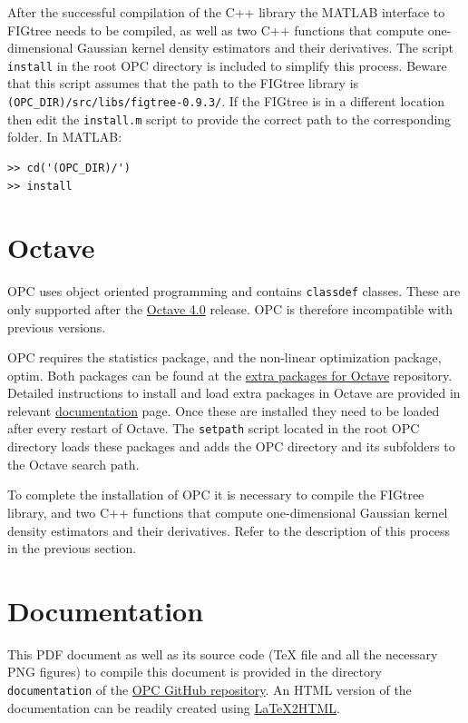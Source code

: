 \documentclass{book}
\begin{document}
After the successful compilation of the C++ library the MATLAB interface to
FIGtree needs to be compiled, as well as two C++ functions that compute
one-dimensional Gaussian kernel density estimators and their derivatives.
%
The script {\tt install} in the root OPC directory is included to simplify this process.
Beware that this script assumes that the path to the FIGtree library is
{\tt (OPC\_DIR)/src/libs/figtree-0.9.3/}. If the FIGtree is in a different location
then edit the {\tt install.m} script to provide the correct path to the corresponding folder.
%
In MATLAB:

\begin{verbatim}
>> cd('(OPC_DIR)/')
>> install
\end{verbatim}


\section{Octave}\label{sec:Octave}

OPC uses object oriented programming and contains {\tt classdef}
classes. These are only supported after the
%
\href{https://octave.org/doc/v4.2.2/classdef-Classes.html#classdef-Classes}
{Octave 4.0}
%
release. OPC is therefore incompatible with previous versions.


OPC requires the statistics package, and the non-linear optimization package,
optim. 
%
Both packages can be found at the
\href{https://octave.sourceforge.io/packages.php}{extra packages for 
Octave} repository.
%
Detailed instructions to install and load extra packages in Octave are
provided in relevant
\href{https://octave.org/doc/interpreter/Packages.html#Packages}{documentation}
page.
%
Once these are installed they need to be loaded after every restart
of Octave. The {\tt setpath} script located in the root OPC directory loads
these packages and adds the OPC directory and its subfolders
to the Octave search path.

To complete the installation of OPC it is necessary to compile the FIGtree
library, and two C++ functions that compute one-dimensional Gaussian kernel
density estimators and their derivatives. Refer to the description of this
process in the previous section.



\section{Documentation}


This PDF document as well as its
source code ({\TeX} file and all the necessary PNG figures) to compile this document is
provided in the directory {\tt documentation} of the
%
\href{https://github.com/nicospavlidis/opc}
{OPC GitHub repository}.
%
An HTML version of the documentation can be readily created using
\href{http://www.latex2html.org/}{LaTeX2HTML}.
%
%
\end{document}
